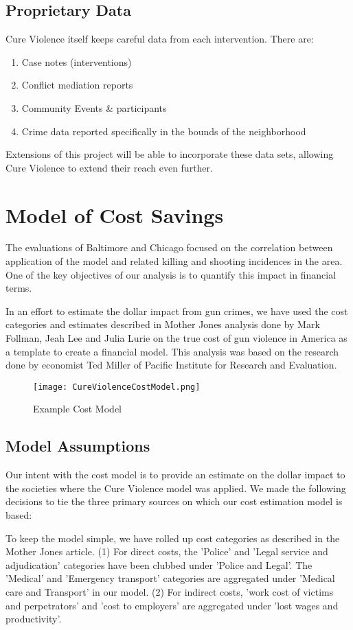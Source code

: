 \documentclass[11pt,preprint]{aastex}
\begin{document}
\subsection*{Proprietary Data}
Cure Violence itself keeps careful data from each intervention. There are:
\begin{enumerate}
\item Case notes (interventions)
\item Conflict mediation reports
\item Community Events \& participants
\item Crime data reported specifically in the bounds of the neighborhood
\end{enumerate}
Extensions of this project will be able to incorporate these data sets, allowing Cure Violence to extend their reach even further.

\section{Model of Cost Savings}
The evaluations of Baltimore and Chicago focused on the correlation between application of the model and related killing and shooting incidences in the area. One of the key objectives of our analysis is to quantify this impact in financial terms.  

In an effort to estimate the dollar impact from gun crimes, we have used the cost categories and estimates described in Mother Jones analysis done by Mark Follman, Jeah Lee and Julia Lurie on the true cost of gun violence in America as a template to create a financial model.  This analysis was based on the research done by economist Ted Miller of Pacific Institute for Research and Evaluation.  
\begin{figure}[h]
\centering
\texttt{[image: CureViolenceCostModel.png]}
\caption{Example Cost Model}
\end{figure}

\subsection*{Model Assumptions}
Our intent with the cost model is to provide an estimate on the dollar impact to the societies where the Cure Violence model was applied.  We made the following decisions to tie the three primary sources on which our cost estimation model is based:  

To keep the model simple, we have rolled up cost categories as described in the Mother Jones article.  (1)	For direct costs, the 'Police' and 'Legal service and adjudication' categories have been clubbed under 'Police and Legal'.  The 'Medical' and 'Emergency transport' categories are aggregated under 'Medical care and Transport' in our model. (2)	For indirect costs, 'work cost of victims and perpetrators' and 'cost to employers' are aggregated under 'lost wages and productivity'.
\end{document}
